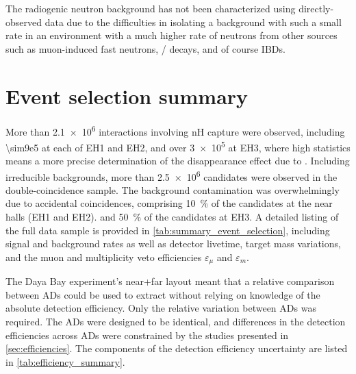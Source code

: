 The radiogenic neutron background has not been characterized
using directly-observed data
due to the difficulties in isolating a background with such a small rate
in an environment with a much higher rate of neutrons from other sources
such as muon-induced fast neutrons, \li{}/\he{} decays, and of course IBDs.

\section{Event selection summary}
\label{sec:event_selection_summary}

More than \num{2.1e6} \nuebar{} interactions involving nH capture were observed,
including \num{\sim9e5} at each of EH1 and EH2,
and over \num{3e5} at EH3, where high statistics means
a more precise determination of the disappearance effect due to \thetaot{}.
Including irreducible backgrounds, more than \num{2.5e6}
\nuebar{} candidates were observed in the double-coincidence sample.
The background contamination was overwhelmingly due to accidental coincidences,
comprising \SI{10}{\percent} of the \nuebar{} candidates
at the near halls (EH1 and EH2).
and \SI{50}{\percent} of the \nuebar{} candidates at EH3.
A detailed listing of the full data sample is provided in
\cref{tab:summary_event_selection},
including signal and background rates
as well as detector livetime, target mass variations,
and the muon and multiplicity veto efficiencies $\varepsilon_\mu$ and $\varepsilon_m$.

The Daya Bay experiment's near+far layout meant that a relative comparison
between ADs could be used to extract \thetaot{}
without relying on knowledge of the absolute detection efficiency.
Only the relative variation between ADs was required.
The ADs were designed to be identical,
and differences in the detection efficiencies across ADs
were constrained by the studies presented in \cref{sec:efficiencies}.
The components of the detection efficiency uncertainty
are listed in \cref{tab:efficiency_summary}.

